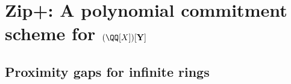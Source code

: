 \documentclass[11pt,letterpaper,usenames,dvipsnames]{article}
\begin{document}
\section{Zip+: A polynomial commitment scheme for $(\QQ[X])[\vec Y]$}

	
\subsection{Proximity gaps for infinite rings}
\label{sec:proximity-gap}




\end{document}
